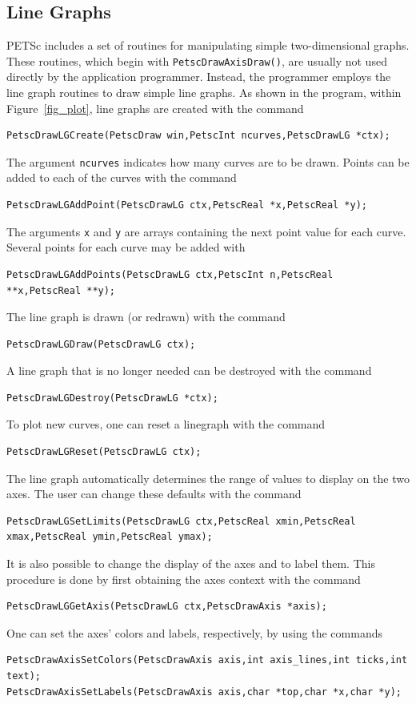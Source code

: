 {{{\subsection{Line Graphs}
PETSc includes a set of routines for manipulating simple two-dimensional
graphs. These routines, which begin with \lstinline{PetscDrawAxisDraw()}, are usually
not used directly by the application programmer.  Instead, the programmer
employs the line graph routines to draw simple line graphs.
As shown in the program, within Figure~\ref{fig_plot}, line graphs
are created with the command  
\begin{lstlisting}
PetscDrawLGCreate(PetscDraw win,PetscInt ncurves,PetscDrawLG *ctx);
\end{lstlisting}
The argument \lstinline{ncurves} indicates how many curves are to be drawn.
Points can be added to each of the curves with the
command
\begin{lstlisting}
PetscDrawLGAddPoint(PetscDrawLG ctx,PetscReal *x,PetscReal *y);
\end{lstlisting}
The arguments \lstinline{x} and \lstinline{y} are arrays containing the next
point value for each curve.
Several points for each curve may be added with
\begin{lstlisting}
PetscDrawLGAddPoints(PetscDrawLG ctx,PetscInt n,PetscReal **x,PetscReal **y);
\end{lstlisting}

The line graph is drawn (or redrawn) with the command
\begin{lstlisting}
PetscDrawLGDraw(PetscDrawLG ctx);
\end{lstlisting}
A line graph that is no longer needed can be destroyed with the
command
\begin{lstlisting}
PetscDrawLGDestroy(PetscDrawLG *ctx);
\end{lstlisting}
To plot new curves, one can reset a linegraph with the
command
\begin{lstlisting}
PetscDrawLGReset(PetscDrawLG ctx);
\end{lstlisting}
The line graph automatically determines the range of values to
display on the two axes.  The user can change these defaults with the
command
\begin{lstlisting}
PetscDrawLGSetLimits(PetscDrawLG ctx,PetscReal xmin,PetscReal xmax,PetscReal ymin,PetscReal ymax);
\end{lstlisting}

It is also possible to change the display of the axes and to label
them. This procedure is done by first obtaining the axes context with the
command  
\begin{lstlisting}
PetscDrawLGGetAxis(PetscDrawLG ctx,PetscDrawAxis *axis);
\end{lstlisting}
One can set the axes' colors and labels, respectively, by using the
commands
\begin{lstlisting}
PetscDrawAxisSetColors(PetscDrawAxis axis,int axis_lines,int ticks,int text);
PetscDrawAxisSetLabels(PetscDrawAxis axis,char *top,char *x,char *y);
\end{lstlisting}

}}}
